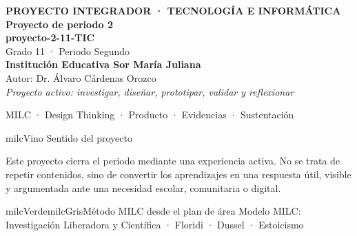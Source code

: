 \documentclass[11pt,letterpaper]{article}
\begin{document}
\thispagestyle{empty}

\vspace*{.85cm}
\begin{tcolorbox}[
  enhanced,colback=milcVino,colframe=milcVino,arc=12mm,width=.86\textwidth,
  boxrule=0pt,left=12mm,right=12mm,top=11mm,bottom=11mm,center,
  overlay={\draw[milcMagenta,line width=2pt,dash pattern=on 9pt off 8pt,rounded corners=10mm]
  ([xshift=7mm,yshift=-7mm]frame.north west) rectangle ([xshift=-7mm,yshift=7mm]frame.south east);}]
  \centering
  {\sffamily\bfseries\color{white}\fontsize{15}{17}\selectfont PROYECTO INTEGRADOR · TECNOLOGÍA E INFORMÁTICA}\\[1.0cm]
  {\sffamily\bfseries\color{white}\fontsize{30}{33}\selectfont Proyecto de periodo 2}\\[3mm]
  {\sffamily\bfseries\color{milcMostaza}\fontsize{25}{28}\selectfont proyecto-2-11-TIC}\\[8mm]
  {\sffamily\color{white}\Large Grado 11 · Periodo Segundo}\\[1.0cm]
  {\sffamily\bfseries\color{white}\large Institución Educativa Sor María Juliana}\\[2mm]
  {\sffamily\color{white}Autor: Dr. Álvaro Cárdenas Orozco}\\[4mm]
  {\sffamily\itshape\color{white}Proyecto activo: investigar, diseñar, prototipar, validar y reflexionar}
\end{tcolorbox}
\vfill
\begin{tcolorbox}[enhanced,colback=milcVino!72!black,colframe=milcVino!72!black,arc=5mm,boxrule=0pt,width=.86\textwidth,left=6mm,right=6mm,top=4mm,bottom=4mm,center]
{\color{white}\sffamily\small MILC · Design Thinking · Producto · Evidencias · Sustentación}
\end{tcolorbox}

\newpage
\begin{titlebox}{milcVino}
Sentido del proyecto
\end{titlebox}
\begin{multicols}{2}
Este proyecto cierra el periodo mediante una experiencia activa. No se trata de repetir contenidos, sino de convertir los aprendizajes en una respuesta útil, visible y argumentada ante una necesidad escolar, comunitaria o digital.

\columnbreak
\begin{softbox}{milcVerde}{milcGris}{Método MILC desde el plan de área}
Modelo MILC: Investigación Liberadora y Científica · Floridi · Dussel · Estoicismo
\end{softbox}
\end{multicols}
\end{document}
